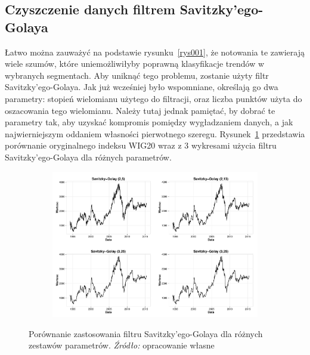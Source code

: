 \documentclass[polish, twoside, 12pt, a4paper]{article}
\theoremstyle{definition}
\theoremstyle{plain}
\theoremstyle{remark}
\begin{document}
\subsection{Czyszczenie danych filtrem Savitzky'ego-Golaya}

Łatwo można zauważyć na podstawie rysunku~\ref{rys001}, że notowania te zawierają wiele szumów, które uniemożliwiłyby poprawną klasyfikacje trendów w wybranych segmentach. Aby uniknąć tego problemu, zostanie użyty 
filtr Savitzky'ego-Golaya. Jak już wcześniej było wspomniane, określają go dwa parametry: stopień wielomianu użytego do filtracji, oraz liczba punktów użyta do oszacowania tego wielomianu. Należy tutaj jednak 
pamiętać, by dobrać te parametry tak, aby uzyskać kompromis pomiędzy wygładzaniem danych, a jak najwierniejszym oddaniem własności pierwotnego szeregu. Rysunek~\ref{rys017} przedstawia porównanie 
oryginalnego indeksu WIG20 wraz z 3 wykresami użycia filtru Savitzky'ego-Golaya dla różnych parametrów.

\begin{figure}[H]
  \centering

  \begin{subfigure}[t]{1.00\textwidth}
    \includegraphics[width=\textwidth]{./rys017}
  \end{subfigure}

  \captionsetup{margin=10pt,font=small,labelfont=bf,width=.8\textwidth}

  \caption[Porównanie zastosowania filtru Savitzky'ego-Golaya dla różnych zestawów parametrów]{Porównanie zastosowania filtru Savitzky'ego-Golaya dla różnych zestawów parametrów. \textit{Źródło:} opracowanie własne}\label{rys017}
\end{figure}
\end{document}
